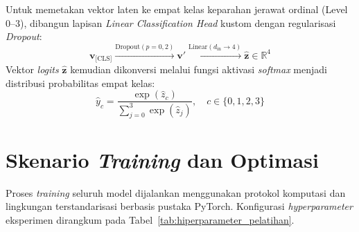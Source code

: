 Untuk memetakan vektor laten ke empat kelas keparahan jerawat ordinal (Level 0--3), dibangun lapisan \textit{Linear Classification Head} kustom dengan regularisasi \textit{Dropout}:
\begin{equation}
    \mathbf{v}_{\text{[CLS]}} \xrightarrow{\text{Dropout}(p=0,2)} \mathbf{v}' \xrightarrow{\text{Linear}(d_{\text{in}} \to 4)} \hat{\mathbf{z}} \in \mathbb{R}^4
\end{equation}
Vektor \textit{logits} $\hat{\mathbf{z}}$ kemudian dikonversi melalui fungsi aktivasi \textit{softmax} menjadi distribusi probabilitas empat kelas:
\begin{equation}
    \hat{y}_c = \frac{\exp(\hat{z}_c)}{\sum_{j=0}^{3} \exp(\hat{z}_j)}, \quad c \in \{0, 1, 2, 3\}
\end{equation}

\section{Skenario \textit{Training} dan Optimasi}
\label{sec:skenario_pelatihan}

Proses \textit{training} seluruh model dijalankan menggunakan protokol komputasi dan lingkungan terstandarisasi berbasis pustaka PyTorch. Konfigurasi \textit{hyperparameter} eksperimen dirangkum pada Tabel~\ref{tab:hiperparameter_pelatihan}.

